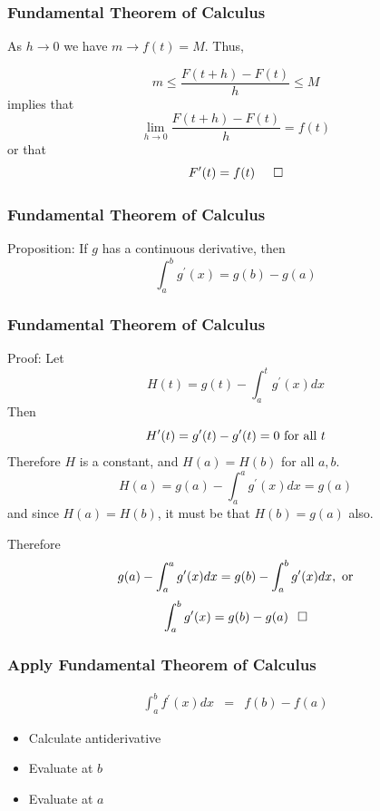 \documentclass{beamer}
\numberwithin{equation}{section}
\begin{document}
\begin{frame}
\frametitle{Fundamental Theorem of Calculus}

\begin{center}
\end{center}

As $h\rightarrow 0$ we have $m\rightarrow f(t)=M$. \pause Thus,

$$m\leq \frac{F(t+h)-F(t)}{h}\leq M$$ \pause implies that $$\lim_{h\rightarrow 0} \frac{F(t+h)-F(t)}{h} =f(t)$$
or that $$F^\prime(t)=f(t) \hspace{.2in }\Box$$

\end{frame}



\begin{frame}
\frametitle{Fundamental Theorem of Calculus}

\begin{theorem}
Proposition: If $g$ has a continuous derivative, then $$\int_a^b g^\prime(x)=g(b)-g(a)$$
\end{theorem} \pause

\end{frame}


\begin{frame}
\frametitle{Fundamental Theorem of Calculus}

Proof: Let $$H(t)=g(t)-\int_a^t g^\prime(x) dx$$ \pause
Then $$H^\prime(t)=g^\prime(t)-g^\prime(t)=0 \hbox{ for all } t$$ \pause
Therefore $H$ is a constant, and $H(a)=H(b)$ for all $a, b$.  $$H(a)=g(a)-\int_a^a g^\prime(x) dx= g(a)$$ 
\pause and since $H(a)=H(b)$, it must be that $H(b)=g(a)$ also. 

\pause Therefore
$$g(a)-\int_a^a g^\prime(x) dx=g(b)-\int_a^b g^\prime(x) dx, \hbox{ or} $$ $$\int_a^b g^\prime(x)=g(b)-g(a) \hspace{.1in}\Box$$

\end{frame}



\begin{frame}
\frametitle{Apply Fundamental Theorem of Calculus}

\begin{eqnarray}
\int_{a}^{b} f^{'} (x) dx & = & f(b) - f(a) \nonumber 
\end{eqnarray} 

\begin{itemize}
\item[-] Calculate \alert{antiderivative}
\item[-] Evaluate at $b$
\item[-] Evaluate at $a$
\end{itemize}

\end{frame}
\end{document}
